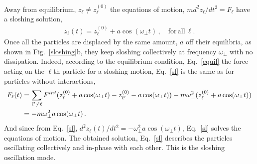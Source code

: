 Away from equilibrium, $z_{\ell} \neq z_{\ell}^{(0)}$ the equations of motion, $m d^2 z_{\ell}/d t^2 = F_{\ell}$ have a sloshing solution,
\begin{align}\label{sl}
z_{\ell}(t) =  z^{(0)}_{\ell} + a \cos (\omega_{\perp} t)\, , \quad  \mathrm{for\, all}\, \ell.
\end{align}
Once all the particles are displaced by the same amount, $a$ off their equilibria, as shown in Fig.~\ref{sloshing}b, they keep sloshing collectively at frequency $\omega_{\perp}$ with no dissipation. 
Indeed, according to the equilibrium condition, Eq.~\eqref{equil} the force acting on the $\ell$th particle for a sloshing motion, Eq.~\eqref{sl} is the same as for particles without interactions,
\begin{align}
F_{\ell}(t)& =\sum_{\ell'\neq \ell}F^{int}(z^{(0)}_{\ell}+ a \cos (\omega_{\perp} t) -z^{(0)}_{\ell'}-a \cos (\omega_{\perp} t))-m\omega_{\perp}^2 (z^{(0)}_{\ell}  + a \cos (\omega_{\perp} t))
\notag \\
& = -m \omega_{\perp}^2 a \cos (\omega_{\perp} t)\, .
\end{align}
And since from Eq.~\eqref{sl}, $d^2 z_{\ell}(t)/d t^2 = - \omega_{\perp}^2 a \cos (\omega_{\perp} t)$, Eq.~\eqref{sl} solves the equations of motion.
%
%
The obtained solution, Eq.~\eqref{sl} describes the particles oscillating collectively and in-phase with each other.
This is the sloshing oscillation mode. 

